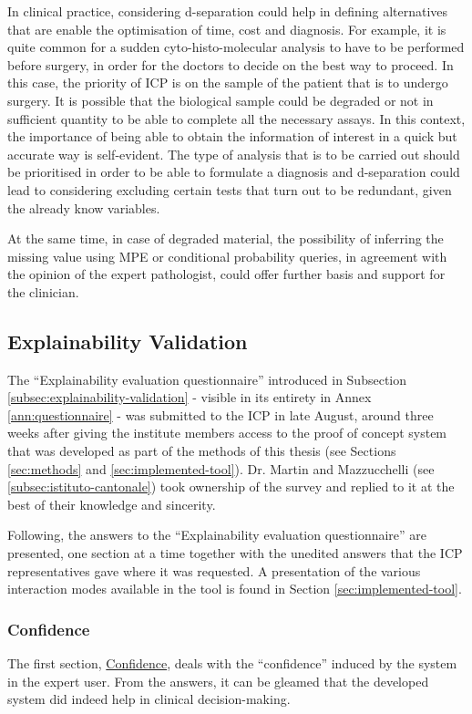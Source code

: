 In clinical practice, considering d-separation could help in defining alternatives that are enable the optimisation of time, cost and diagnosis. 
For example, it is quite common for a sudden cyto-histo-molecular analysis to have to be performed before surgery, in order for the doctors to decide on the best way to proceed.
 In this case, the priority of ICP is on the sample of the patient that is to undergo surgery. 
 It is possible that the biological sample could be degraded or not in sufficient quantity to be able to complete all the necessary assays. 
 In this context, the importance of being able to obtain the information of interest in a quick but accurate way is self-evident.
The type of analysis that is to be carried out should be prioritised in order to be able to formulate a diagnosis and d-separation could lead to considering excluding certain tests that turn out to be redundant, given the already know variables.

At the same time, in case of degraded material, the possibility of inferring the missing value using MPE or conditional probability queries, in agreement with the opinion of the expert pathologist, could offer further basis and support for the clinician.

\subsection{Explainability Validation} \label{subsec:explainability-validation-results}
The \enquote{Explainability evaluation questionnaire} introduced in Subsection \ref{subsec:explainability-validation} - visible in its entirety in Annex \ref{ann:questionnaire} - was submitted to the ICP in late August, around three weeks after giving the institute members access to the proof of concept system that was developed as part of the methods of this thesis (see Sections \ref{sec:methods} and \ref{sec:implemented-tool}).
Dr. Martin and Mazzucchelli (see \ref{subsec:istituto-cantonale}) took ownership of the survey and replied to it at the best of their knowledge and sincerity.

Following, the answers to the \enquote{Explainability evaluation questionnaire} are presented, one section at a time together with the unedited answers that the ICP representatives gave where it was requested.
A presentation of the various interaction modes available in the tool is found in Section \ref{sec:implemented-tool}.

\subsubsection{Confidence}
The first section, \hyperref[ques:confidence]{Confidence}, deals with the \enquote{confidence} induced by the system in the expert user.
From the answers, it can be gleamed that the developed system did indeed help in clinical decision-making.

